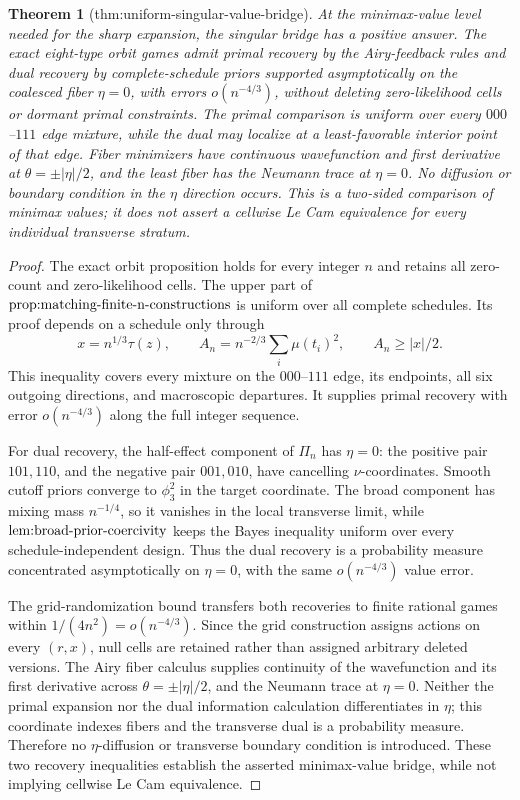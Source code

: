 \documentclass{article}
\newtheorem{theorem}{Theorem}
\begin{document}
\begin{theorem}[thm:uniform-singular-value-bridge]\label{thm:uniform-singular-value-bridge}
At the minimax-value level needed for the sharp expansion, the singular bridge has a positive answer.  The exact eight-type orbit games admit primal recovery by the Airy-feedback rules and dual recovery by complete-schedule priors supported asymptotically on the coalesced fiber \(\eta=0\), with errors \(o(n^{-4/3})\), without deleting zero-likelihood cells or dormant primal constraints.  The primal comparison is uniform over every \(000\)--\(111\) edge mixture, while the dual may localize at a least-favorable interior point of that edge.  Fiber minimizers have continuous wavefunction and first derivative at \(\theta=\pm|\eta|/2\), and the least fiber has the Neumann trace at \(\eta=0\).  No diffusion or boundary condition in the \(\eta\) direction occurs.  This is a two-sided comparison of minimax values; it does not assert a cellwise Le Cam equivalence for every individual transverse stratum.
\end{theorem}
\begin{proof}
The exact orbit proposition holds for every integer \(n\) and retains all zero-count and zero-likelihood cells.  The upper part of \(\textnormal{prop:matching-finite-n-constructions}\) is uniform over all complete schedules.  Its proof depends on a schedule only through
\[
x=n^{1/3}\tau(z),
\qquad
A_n=n^{-2/3}\sum_i\mu(t_i)^2,
\qquad
A_n\geq |x|/2.
\]
This inequality covers every mixture on the \(000\)--\(111\) edge, its endpoints, all six outgoing directions, and macroscopic departures.  It supplies primal recovery with error \(o(n^{-4/3})\) along the full integer sequence.

For dual recovery, the half-effect component of \(\Pi_n\) has \(\eta=0\): the positive pair \(101,110\), and the negative pair \(001,010\), have cancelling \(\nu\)-coordinates.  Smooth cutoff priors converge to \(\phi_3^2\) in the target coordinate.  The broad component has mixing mass \(n^{-1/4}\), so it vanishes in the local transverse limit, while \(\textnormal{lem:broad-prior-coercivity}\) keeps the Bayes inequality uniform over every schedule-independent design.  Thus the dual recovery is a probability measure concentrated asymptotically on \(\eta=0\), with the same \(o(n^{-4/3})\) value error.

The grid-randomization bound transfers both recoveries to finite rational games within \(1/(4n^2)=o(n^{-4/3})\).  Since the grid construction assigns actions on every \((r,x)\), null cells are retained rather than assigned arbitrary deleted versions.  The Airy fiber calculus supplies continuity of the wavefunction and its first derivative across \(\theta=\pm|\eta|/2\), and the Neumann trace at \(\eta=0\).  Neither the primal expansion nor the dual information calculation differentiates in \(\eta\); this coordinate indexes fibers and the transverse dual is a probability measure.  Therefore no \(\eta\)-diffusion or transverse boundary condition is introduced.  These two recovery inequalities establish the asserted minimax-value bridge, while not implying cellwise Le Cam equivalence.
\end{proof}
\end{document}
